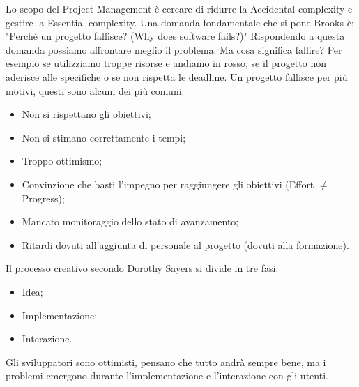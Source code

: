 Lo scopo del Project Management è cercare di ridurre la Accidental complexity e gestire la Essential complexity.\newline
Una domanda fondamentale che si pone Brooks è: "Perché un progetto fallisce? (Why does software fails?)"\newline
Rispondendo a questa domanda possiamo affrontare meglio il problema. Ma cosa significa fallire? Per esempio se utilizziamo troppe risorse e andiamo in rosso, se il progetto non aderisce alle specifiche o se non rispetta le deadline.\newline
Un progetto fallisce per più motivi, questi sono alcuni dei più comuni:
\begin{itemize}
	\item Non si rispettano gli obiettivi;
	\item Non si stimano correttamente i tempi;
	\item Troppo ottimismo;
	\item Convinzione che basti l'impegno per raggiungere gli obiettivi (Effort $\neq$ Progress);
	\item Mancato monitoraggio dello stato di avanzamento;
	\item Ritardi dovuti all'aggiunta di personale al progetto (dovuti alla formazione).
\end{itemize}
Il processo creativo secondo Dorothy Sayers si divide in tre fasi:
\begin{itemize}
	\item Idea;
	\item Implementazione;
	\item Interazione.
\end{itemize}
Gli sviluppatori sono ottimisti, pensano che tutto andrà sempre bene, ma i problemi emergono durante l'implementazione e l'interazione con gli utenti.
